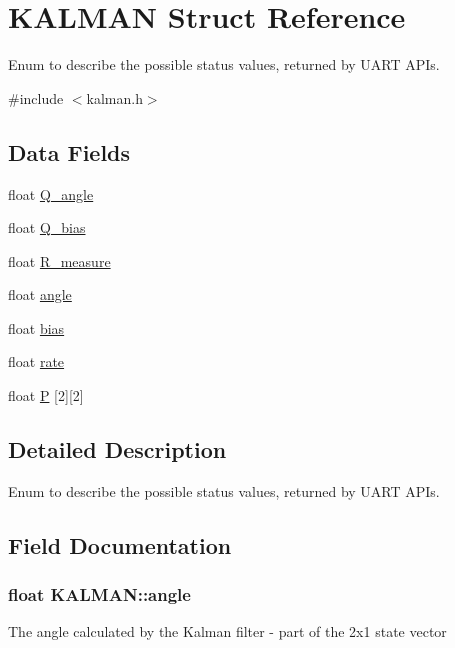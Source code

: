 \hypertarget{struct_k_a_l_m_a_n}{}\section{K\+A\+L\+M\+AN Struct Reference}
\label{struct_k_a_l_m_a_n}


Enum to describe the possible status values, returned by U\+A\+RT A\+P\+Is.  




{\ttfamily \#include $<$kalman.\+h$>$}

\subsection*{Data Fields}
\begin{DoxyCompactItemize}
\item 
float \hyperlink{struct_k_a_l_m_a_n_aa01590888375644c333d19896f117d63}{Q\+\_\+angle}
\item 
float \hyperlink{struct_k_a_l_m_a_n_a2c94df3643ff19d4031af1fe7e5a3840}{Q\+\_\+bias}
\item 
float \hyperlink{struct_k_a_l_m_a_n_a5f9d475ffd34d89ef5e9e265236df4c4}{R\+\_\+measure}
\item 
float \hyperlink{struct_k_a_l_m_a_n_ae4eba0816ad29524574ca83ef239d52d}{angle}
\item 
float \hyperlink{struct_k_a_l_m_a_n_aa68aa8fbee41f0180f107fae39b4d44b}{bias}
\item 
float \hyperlink{struct_k_a_l_m_a_n_a81faa619025b1fd34ecba15ffc858cf9}{rate}
\item 
float \hyperlink{struct_k_a_l_m_a_n_a361e4602cfa284d862f2cbdfd34b1ddd}{P} \mbox{[}2\mbox{]}\mbox{[}2\mbox{]}
\end{DoxyCompactItemize}


\subsection{Detailed Description}
Enum to describe the possible status values, returned by U\+A\+RT A\+P\+Is. 

\subsection{Field Documentation}
\subsubsection[{\texorpdfstring{angle}{angle}}]{\setlength{\rightskip}{0pt plus 5cm}float K\+A\+L\+M\+A\+N\+::angle}\hypertarget{struct_k_a_l_m_a_n_ae4eba0816ad29524574ca83ef239d52d}{}\label{struct_k_a_l_m_a_n_ae4eba0816ad29524574ca83ef239d52d}
The angle calculated by the Kalman filter -\/ part of the 2x1 state vector 
